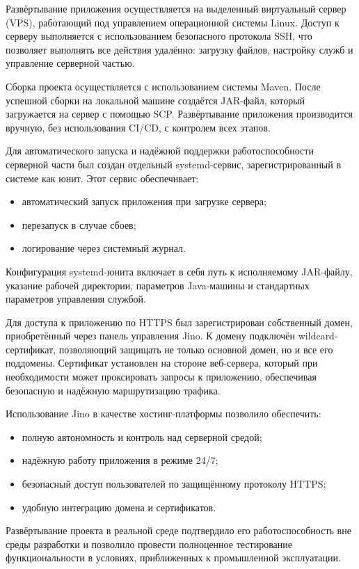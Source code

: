 Развёртывание приложения осуществляется на выделенный виртуальный сервер (VPS), работающий под управлением операционной системы Linux. Доступ к серверу выполняется с использованием безопасного протокола SSH, что позволяет выполнять все действия удалённо: загрузку файлов, настройку служб и управление серверной частью.

Сборка проекта осуществляется с использованием системы Maven. После успешной сборки на локальной машине создаётся JAR-файл, который загружается на сервер с помощью SCP. Развёртывание приложения производится вручную, без использования CI/CD, с контролем всех этапов.

Для автоматического запуска и надёжной поддержки работоспособности серверной части был создан отдельный systemd-сервис, зарегистрированный в системе как юнит. Этот сервис обеспечивает:
\begin{itemize}
    \item автоматический запуск приложения при загрузке сервера;
    \item перезапуск в случае сбоев;
    \item логирование через системный журнал.
\end{itemize}

Конфигурация systemd-юнита включает в себя путь к исполняемому JAR-файлу, указание рабочей директории, параметров Java-машины и стандартных параметров управления службой.

Для доступа к приложению по HTTPS был зарегистрирован собственный домен, приобретённый через панель управления Jino. К домену подключён wildcard-сертификат, позволяющий защищать не только основной домен, но и все его поддомены. Сертификат установлен на стороне веб-сервера, который при необходимости может проксировать запросы к приложению, обеспечивая безопасную и надёжную маршрутизацию трафика.


Использование Jino в качестве хостинг-платформы позволило обеспечить:
\begin{itemize}
    \item полную автономность и контроль над серверной средой;
    \item надёжную работу приложения в режиме 24/7;
    \item безопасный доступ пользователей по защищённому протоколу HTTPS;
    \item удобную интеграцию домена и сертификатов.
\end{itemize}

Развёртывание проекта в реальной среде подтвердило его работоспособность вне среды разработки и позволило провести полноценное тестирование функциональности в условиях, приближенных к промышленной эксплуатации.

